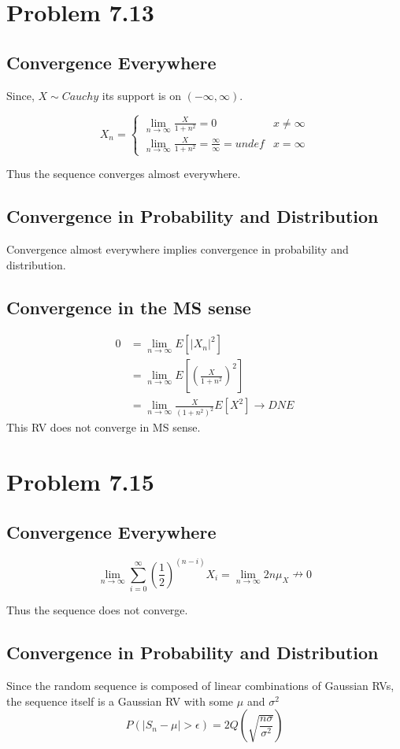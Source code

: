 \documentclass[12pt]{article}
\begin{document}
\section{Problem 7.13}
\subsection{Convergence Everywhere}
Since, $X \sim Cauchy$ its support is on $(-\infty,\infty)$.

\[
  X_n = 
\begin{cases}
  \lim_{n\to\infty} \frac{X}{1+n^2} = 0 & x \neq \infty \\ 
  \lim_{n\to\infty} \frac{X}{1+n^2} = \frac{\infty}{\infty} = undef & x = \infty
\end{cases}
\] 

Thus the sequence converges almost everywhere.

\subsection{Convergence in Probability and Distribution}
Convergence almost everywhere implies convergence in probability and distribution.

\subsection{Convergence in the MS sense}
\begin{align*}
  0 &= \lim_{n\to\infty} E\left[ |X_n|^2 \right] \\
  &= \lim_{n\to\infty} E\left[ \left(\frac{X}{1+n^2}\right)^2 \right] \\
  &= \lim_{n\to\infty} \frac{X}{(1+n^2)^2} E[ X^2 ] \to DNE
\end{align*}
This RV does not converge in MS sense. 

\section{Problem 7.15}
\subsection{Convergence Everywhere}

\[
  \lim_{n\to\infty} \sum_{i=0}^{\infty} \left( \frac{1}{2} \right)^(n-i) X_i =
  \lim_{n\to\infty} 2n\mu_X \nrightarrow 0
\] 

Thus the sequence does not converge.

\subsection{Convergence in Probability and Distribution}
Since the random sequence is composed of linear combinations of Gaussian RVs, the 
sequence itself is a Gaussian RV with some $\mu$ and $\sigma^2$
\[
  P(|S_n - \mu| > \epsilon) = 2Q\left( \sqrt{\frac{n\sigma}{\sigma^2}} \right)
\]
\end{document}
